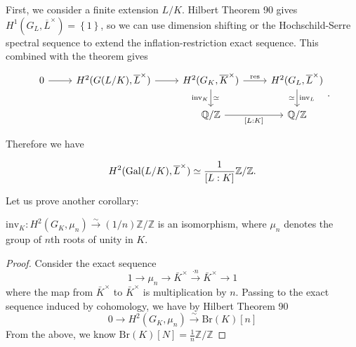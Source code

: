 First, we consider a finite extension \(L / K\). 
Hilbert Theorem 90 gives 
$H^{1}(G_L,\overline{L}^{\times})=\left\lbrace1\right\rbrace$, 
so we can use dimension shifting or the Hochschild-Serre spectral sequence 
to extend the inflation-restriction exact sequence. 
This combined with the theorem gives
\[
\begin{tikzcd}
	0\ar[r] & H^{2}(G(L/K),\overline{L}^{\times})\ar[r] & H^{2}(G_K,\overline{K}^{\times})\ar{r}{\res}\ar[d,"\inv_K"',"\simeq"] & H^{2}(G_L,\overline{L}^{\times})\ar[d,"\inv_L","\simeq"']\\
		& & \QQ/\ZZ\ar{r}[swap]{[L:K]} & \QQ/\ZZ
\end{tikzcd}
.\] 

Therefore we have
\begin{corollary}
	\[
		H^{2}(\operatorname{Gal}(L/K),\overline{L}^{\times})
		\simeq\frac{1}{[L:K]}\mathbb{Z}/\mathbb{Z}.
	\]
\end{corollary}

Let us prove another corollary:
\begin{corollary}
$\text{inv}_K: H^2(G_K, \mu_n) \xrightarrow{\sim} (1/n)\mathbb{Z}/\mathbb{Z}$ is an isomorphism, where $\mu_n$ denotes the group of $n$th roots of unity in $K$.
\end{corollary}
\begin{proof}
Consider the exact sequence 
$$1\rightarrow \mu_n\rightarrow 
\bar{K}^\times\xrightarrow{\cdot n}\bar{K}^\times\rightarrow 1$$ 
where the map from 
$\bar{K}^\times$ 
to $\bar{K}^\times$ 
is multiplication by $n$. 
Passing to the exact sequence induced by cohomology, we have 
by Hilbert Theorem 90
$$0\rightarrow H^2(G_K,\mu_n)\xrightarrow{\sim} \text{Br}(K)[n]$$ 
From the above, we know $\text{Br}(K)[N]=\frac{1}{n}\mathbb{Z}/\mathbb{Z}$
\end{proof}

%
%
%


